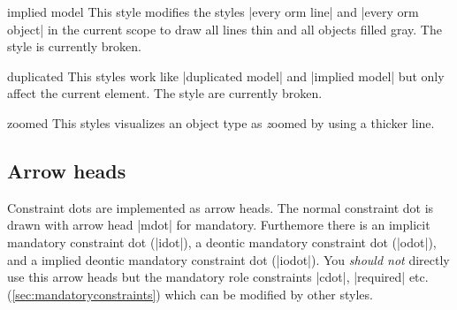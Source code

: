 \documentclass[a4paper,10pt]{article}
\begin{document}
\begin{stylekey}{implied model}
  This style modifies the styles |every orm line| and |every orm object| in the current scope to draw all lines thin and all objects filled gray.
  The style is currently broken.
\begin{figure}[h]
\centering
\begin{codeexample}[]
\end{codeexample}
\end{figure}
\end{stylekey}

\begin{stylekey}{duplicated}
This styles work like |duplicated model| and |implied model| but only affect the current element.
The style are currently broken.
\begin{codeexample}[]
\end{codeexample}
\end{stylekey}


\begin{stylekey}{zoomed}
This styles visualizes an object type as {\emph zoomed} by using a thicker line.
\begin{codeexample}[]
\end{codeexample}
\end{stylekey}


\subsection{Arrow heads}
\label{sec:arrowheads}
Constraint dots are implemented as arrow heads. The normal constraint 
dot is drawn with arrow head |mdot| for mandatory. Furthemore there is an
implicit mandatory constraint dot (|idot|), a deontic mandatory constraint 
dot (|odot|), and a implied deontic mandatory constraint dot (|iodot|). You 
\emph{should not} directly use this arrow heads but the mandatory role 
constraints |cdot|, |required| etc. (\ref{sec:mandatoryconstraints}) which
can be modified by other styles.
\end{document}
